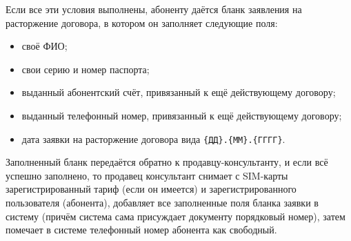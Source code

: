 Если все эти условия выполнены, абоненту даётся бланк заявления на расторжение договора, в котором он заполняет следующие поля:
\begin{itemize}
    \item своё ФИО;
    \item свои серию и номер паспорта;
    \item выданный абонентский счёт, привязанный к ещё действующему договору;
    \item выданный телефонный номер, привязанный к ещё действующему договору;
    \item дата заявки на расторжение договора вида \texttt{\{ДД\}.\{ММ\}.\{ГГГГ\}}.
\end{itemize}

Заполненный бланк передаётся обратно к продавцу-консультанту, и если всё успешно заполнено, то продавец консультант снимает с SIM-карты зарегистрированный тариф (если он имеется) и зарегистрированного пользователя (абонента), добавляет все заполненные поля бланка заявки в систему (причём система сама присуждает документу порядковый номер), затем помечает в системе телефонный номер абонента как свободный.





